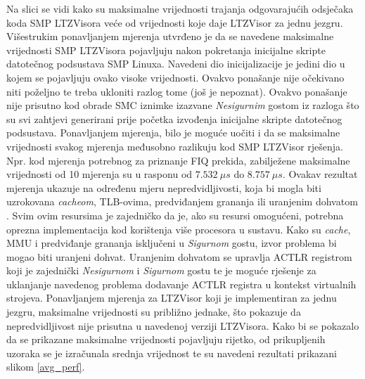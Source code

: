 \documentclass[times, utf8, diplomski, numeric]{fer}
\begin{document}
Na slici se vidi kako su maksimalne vrijednosti trajanja odgovarajućih odsječaka koda SMP LTZVisora veće od vrijednosti
koje daje LTZVisor za jednu jezgru. Višestrukim ponavljanjem mjerenja utvrđeno je da se navedene maksimalne vrijednosti
SMP LTZVisora pojavljuju nakon pokretanja inicijalne skripte datotečnog podsustava SMP Linuxa. Navedeni dio inicijalizacije
je jedini dio u kojem se pojavljuju ovako visoke vrijednosti. Ovakvo ponašanje nije očekivano niti poželjno te treba ukloniti
razlog tome (još je nepoznat). Ovakvo ponašanje nije prisutno kod obrade SMC iznimke izazvane \textit{Nesigurnim} gostom
iz razloga što su svi zahtjevi generirani prije početka izvođenja inicijalne skripte datotečnog podsustava.
Ponavljanjem mjerenja, bilo je moguće uočiti i da se maksimalne vrijednosti svakog mjerenja međusobno razlikuju kod
SMP LTZVisor rješenja. Npr. kod mjerenja potrebnog za priznanje FIQ prekida, zabilježene maksimalne vrijednosti od 10
mjerenja su u rasponu od $7.532~\mu s$ do $8.757~\mu s$. Ovakav rezultat mjerenja ukazuje na određenu mjeru
nepredvidljivosti, koja bi mogla biti uzrokovana \textit{cacheom}, TLB-ovima, predviđanjem grananja ili uranjenim
dohvatom . Svim ovim resursima je zajedničko da je, ako su resursi omogućeni, potrebna oprezna implementacija
kod korištenja više procesora u sustavu.
Kako su \textit{cache}, MMU i predviđanje grananja isključeni u \textit{Sigurnom} gostu, izvor
problema bi mogao biti uranjeni dohvat. Uranjenim dohvatom se upravlja ACTLR registrom koji je zajednički
\textit{Nesigurnom} i \textit{Sigurnom} gostu te je moguće rješenje za uklanjanje navedenog problema dodavanje ACTLR
registra u kontekst virtualnih strojeva.
Ponavljanjem mjerenja za LTZVisor koji je implementiran za jednu jezgru, maksimalne vrijednosti su približno jednake,
što pokazuje da nepredvidljivost nije prisutna u navedenoj verziji LTZVisora.
Kako bi se pokazalo da se prikazane maksimalne vrijednosti pojavljuju rijetko, od
prikupljenih uzoraka se je izračunala srednja vrijednost te su navedeni rezultati prikazani slikom \ref{avg_perf}.
\end{document}
